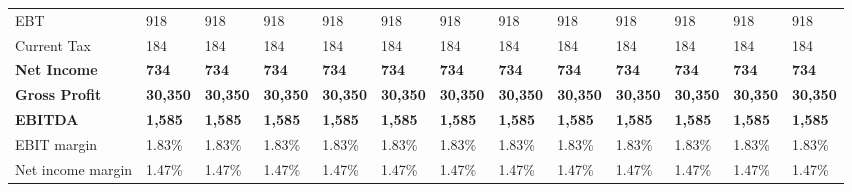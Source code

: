 \begin{tabular}{lllllllllllll}
 EBT                              & 918            & 918            & 918            & 918            & 918            & 918            & 918            & 918            & 918            & 918            & 918            & 918            \\
 Current Tax                      & 184            & 184            & 184            & 184            & 184            & 184            & 184            & 184            & 184            & 184            & 184            & 184            \\
 \hline \textbf{Net Income}         & \textbf{734}    & \textbf{734}    & \textbf{734}    & \textbf{734}    & \textbf{734}    & \textbf{734}    & \textbf{734}    & \textbf{734}    & \textbf{734}    & \textbf{734}    & \textbf{734}    & \textbf{734}    \\
 \hline \textbf{Gross Profit}       & \textbf{30,350} & \textbf{30,350} & \textbf{30,350} & \textbf{30,350} & \textbf{30,350} & \textbf{30,350} & \textbf{30,350} & \textbf{30,350} & \textbf{30,350} & \textbf{30,350} & \textbf{30,350} & \textbf{30,350} \\
 \hline \textbf{EBITDA}             & \textbf{1,585}  & \textbf{1,585}  & \textbf{1,585}  & \textbf{1,585}  & \textbf{1,585}  & \textbf{1,585}  & \textbf{1,585}  & \textbf{1,585}  & \textbf{1,585}  & \textbf{1,585}  & \textbf{1,585}  & \textbf{1,585}  \\
 EBIT margin                      & 1.83\%          & 1.83\%          & 1.83\%          & 1.83\%          & 1.83\%          & 1.83\%          & 1.83\%          & 1.83\%          & 1.83\%          & 1.83\%          & 1.83\%          & 1.83\%          \\
 Net income margin                & 1.47\%          & 1.47\%          & 1.47\%          & 1.47\%          & 1.47\%          & 1.47\%          & 1.47\%          & 1.47\%          & 1.47\%          & 1.47\%          & 1.47\%          & 1.47\%          \\
\hline
\end{tabular}